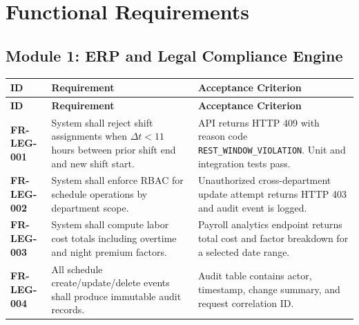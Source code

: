 \documentclass[11pt,a4paper]{article}
\newcommand{\req}[1]{\textbf{\textcolor{Primary}{#1}}}
\newcommand{\thead}[1]{\textcolor{HeaderText}{\textbf{#1}}}
\begin{document}
\section{Functional Requirements}

\subsection{Module 1: ERP and Legal Compliance Engine}
\begin{longtable}{P{0.13\textwidth}P{0.47\textwidth}P{0.28\textwidth}}
\toprule
{}
\thead{ID} & \thead{Requirement} & \thead{Acceptance Criterion} \\
\midrule
\endfirsthead
\toprule
{}
\thead{ID} & \thead{Requirement} & \thead{Acceptance Criterion} \\
\midrule
\endhead
\req{FR-LEG-001} & System shall reject shift assignments when $\Delta t < 11$ hours between prior shift end and new shift start. & API returns HTTP 409 with reason code \texttt{REST\_WINDOW\_VIOLATION}. Unit and integration tests pass. \\
\req{FR-LEG-002} & System shall enforce RBAC for schedule operations by department scope. & Unauthorized cross-department update attempt returns HTTP 403 and audit event is logged. \\
\req{FR-LEG-003} & System shall compute labor cost totals including overtime and night premium factors. & Payroll analytics endpoint returns total cost and factor breakdown for a selected date range. \\
\req{FR-LEG-004} & All schedule create/update/delete events shall produce immutable audit records. & Audit table contains actor, timestamp, change summary, and request correlation ID. \\
\bottomrule
\end{longtable}
\end{document}

